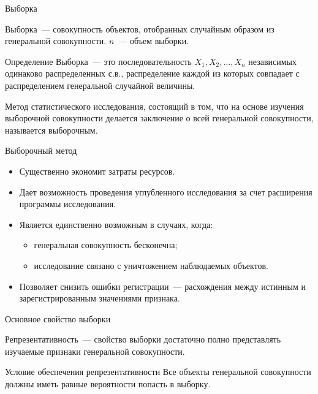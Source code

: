 \documentclass[unicode,11pt,notheorems,xcolor=table]{beamer}
\begin{document}
\begin{frame}{Выборка}{}

    \alert{Выборка}~--- совокупность объектов, отобранных случайным образом из генеральной совокупности.
    $n$~--- объем выборки.

    \vfill
    \begin{block}{Определение}
        \alert{Выборка}~--- это последовательность $X_1, X_2,\ldots, X_n$ независимых одинаково распределенных с.в., распределение каждой из которых совпадает с распределением генеральной случайной величины.
    \end{block}

    \vfill
    Метод статистического исследования, состоящий в том, что на основе изучения выборочной совокупности делается заключение о всей генеральной совокупности, называется \alert{выборочным.}

\end{frame}
\begin{frame}{Выборочный метод}{}
    \begin{itemize}
        \item Существенно экономит затраты ресурсов.
        
        \vfill
        \item Дает возможность проведения углубленного исследования за счет расширения программы исследования.

        \vfill
        \item Является единственно возможным в случаях, когда:
        \begin{itemize}
            \item генеральная совокупность бесконечна;
            \item исследование связано с уничтожением наблюдаемых объектов.
        \end{itemize}

        \vfill
        \item Позволяет снизить ошибки регистрации~--- расхождения между истинным и зарегистрированным значениями признака.
    \end{itemize}
\end{frame}
\begin{frame}{Основное свойство выборки}{}
    


    \alert{Репрезентативность}~--- свойство выборки достаточно полно представлять изучаемые признаки генеральной совокупности. 
    
    \vfill
    \begin{block}{Условие обеспечения репрезентативности}
         Все объекты генеральной совокупности должны иметь равные вероятности попасть в выборку.
    \end{block}
\end{frame}
\end{document}
